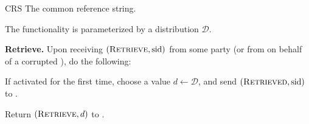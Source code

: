 \begin{cccFunctionality}
    {\funcCRS}
    {CRS}
    {The common reference string.}

    The functionality is parameterized by a distribution $\mathcal{D}$.

    \begin{cccItemize}[noitemsep]
        \item \textbf{Retrieve.} Upon receiving $(\textsc{Retrieve}, \mathrm{sid})$ from some party \party (or from \adv on behalf of a corrupted \party), do the following:
        \begin{cccEnum}[nosep]
            \item If activated for the first time, choose a value $d \gets \mathcal{D}$, and send $(\textsc{Retrieved}, \mathrm{sid})$ to \wrapper{\funcRO}.

            \item Return $(\textsc{Retrieve}, d)$ to \party.
        \end{cccEnum}
    \end{cccItemize}
\end{cccFunctionality}